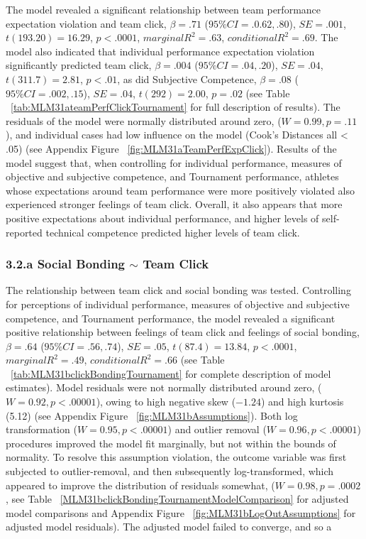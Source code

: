  The model revealed a significant relationship between team performance expectation violation and team click, $\beta = .71$ ($95\% CI =  .0.62, .80$), $SE = .001$, $t(193.20) = 16.29$, $p < .0001$, $marginal R^2 = .63$, $conditional R^2 = .69$.
 The model also indicated that individual performance expectation violation significantly predicted team click, $\beta = .004$ ($95\% CI =  .04, .20$), $SE = .04$, $t(311.7) = 2.81$, $p < .01$, as did Subjective Competence, $\beta = .08$ ($95\% CI =  .002, .15$), $SE = .04$, $t(292) = 2.00$, $p = .02$  (see Table ~\ref{tab:MLM31ateamPerfClickTournament} for full description of results).
 The residuals of the model were normally distributed around zero, ($W = 0.99, p = .11$), and individual cases had low influence on the model (Cook's Distances all < .05) (see Appendix Figure ~\ref{fig:MLM31aTeamPerfExpClick}).
 Results of the model suggest that, when controlling for individual performance, measures of objective and subjective competence, and Tournament performance, athletes whose expectations around team performance were more positively violated also experienced stronger feelings of team click. Overall, it also appears that more positive expectations about individual performance, and higher levels of self-reported technical competence predicted higher levels of team click.



 



\subsubsection{3.2.a Social Bonding $\sim$ Team Click}
 The relationship between team click and social bonding was tested. Controlling for perceptions of individual performance, measures of objective and subjective competence, and Tournament performance, the model revealed a significant positive relationship between feelings of team click and feelings of social bonding, $\beta = .64$ ($95\% CI = .56, .74$), $SE = .05$, $t(87.4) = 13.84$, $p < .0001$, $marginal R^2 = .49$, $conditional R^2 = .66$ (see Table ~\ref{tab:MLM31bclickBondingTournament} for complete description of model estimates). Model residuals were not normally distributed around zero, ($W = 0.92, p < .00001$), owing to high negative skew ($-1.24$) and high kurtosis (5.12) (see Appendix Figure ~\ref{fig:MLM31bAssumptions}).
 Both log transformation ($W = 0.95, p < .00001$) and outlier removal ($W = 0.96, p < .00001$) procedures improved the model fit marginally, but not within the bounds of normality.
 To resolve this assumption violation, the outcome variable was first subjected to outlier-removal, and then subsequently log-transformed, which appeared to improve the distribution of residuals somewhat, ($W = 0.98, p = .0002$, see Table ~\ref{MLM31bclickBondingTournamentModelComparison} for adjusted model comparisons and Appendix Figure ~\ref{fig:MLM31bLogOutAssumptions} for adjusted model residuals).
 The adjusted model failed to converge, and so a

